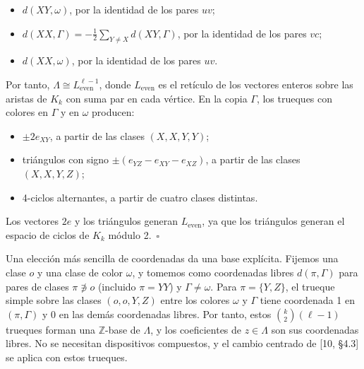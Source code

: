 \documentclass[spanish,11pt,a4paper]{article}
\providecommand{\tightlist}{\setlength{\itemsep}{0pt}\setlength{\parskip}{0pt}}
\begin{document}
\begin{itemize}
\tightlist
\item
  \(d(XY,\omega)\), por la identidad de los pares \(uv\);
\item
  \(d(XX,\Gamma)=-\frac12\sum_{Y\ne X}d(XY,\Gamma)\), por la identidad de los pares \(vc\);
\item
  \(d(XX,\omega)\), por la identidad de los pares \(uv\).
\end{itemize}

Por tanto, \(\Lambda\cong L_{\mathrm{even}}^{\ell-1}\), donde \(L_{\mathrm{even}}\) es el retículo de los vectores enteros sobre las aristas de \(K_k\) con suma par en cada vértice. En la copia \(\Gamma\), los trueques con colores en \(\Gamma\) y en \(\omega\) producen:

\begin{itemize}
\tightlist
\item
  \(\pm2e_{XY}\), a partir de las clases \((X,X,Y,Y)\);
\item
  triángulos con signo \(\pm(e_{YZ}-e_{XY}-e_{XZ})\), a partir de las clases \((X,X,Y,Z)\);
\item
  4-ciclos alternantes, a partir de cuatro clases distintas.
\end{itemize}

Los vectores \(2e\) y los triángulos generan \(L_{\mathrm{even}}\), ya que los triángulos generan el espacio de ciclos de \(K_k\) módulo 2.~\(\square\)

Una elección más sencilla de coordenadas da una base explícita. Fijemos una clase \(o\) y una clase de color \(\omega\), y tomemos como coordenadas libres \(d(\pi,\Gamma)\) para pares de clases \(\pi\not\ni o\) (incluido \(\pi=YY\)) y \(\Gamma\ne\omega\). Para \(\pi=\{Y,Z\}\), el trueque simple sobre las clases \((o,o,Y,Z)\) entre los colores \(\omega\) y \(\Gamma\) tiene coordenada 1 en \((\pi,\Gamma)\) y 0 en las demás coordenadas libres. Por tanto, estos \(\binom{k}{2}(\ell-1)\) trueques forman una \(\mathbb Z\)-base de \(\Lambda\), y los coeficientes de \(z\in\Lambda\) son sus coordenadas libres. No se necesitan dispositivos compuestos, y el cambio centrado de {[}10, §4.3{]} se aplica con estos trueques.
\end{document}
